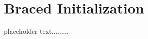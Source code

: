 \newpage
\section[Braced Initialization]{Braced Initialization}\label{bracedinit}


placeholder text.........


